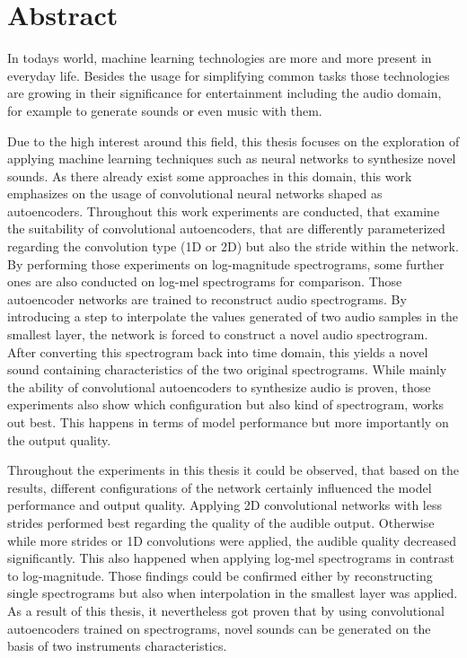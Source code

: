 \chapter{Abstract}

In todays world, machine learning technologies are more and more present in everyday life. Besides the usage for simplifying common tasks those technologies are growing in their significance for entertainment including the audio domain, for example to generate sounds or even music with them. 

Due to the high interest around this field, this thesis focuses on the exploration of applying machine learning techniques such as neural networks to synthesize novel sounds. As there already exist some approaches in this domain, this work emphasizes on the usage of convolutional neural networks shaped as autoencoders. Throughout this work experiments are conducted, that examine the suitability of convolutional autoencoders, that are differently parameterized regarding the convolution type (1D or 2D) but also the stride within the network. By performing those experiments on log-magnitude spectrograms, some further ones are also conducted on log-mel spectrograms for comparison. Those autoencoder networks are trained to reconstruct audio spectrograms. By introducing a step to interpolate the values generated of two audio samples in the smallest layer, the network is forced to construct a novel audio spectrogram. After converting this spectrogram back into time domain, this yields a novel sound containing characteristics of the two original spectrograms. While mainly the ability of convolutional autoencoders to synthesize audio is proven, those experiments also show which configuration but also kind of spectrogram, works out best. This happens in terms of model performance but more importantly on the output quality. 

Throughout the experiments in this thesis it could be observed, that based on the results, different configurations of the network certainly influenced the model performance and output quality. Applying 2D convolutional networks with less strides performed best regarding the quality of the audible output. Otherwise while more strides or 1D convolutions were applied, the audible quality decreased significantly. This also happened when applying log-mel spectrograms in contrast to log-magnitude. Those findings could be confirmed either by reconstructing single spectrograms but also when interpolation in the smallest layer was applied. As a result of this thesis, it nevertheless got proven that by using convolutional autoencoders trained on spectrograms, novel sounds can be generated on the basis of two instruments characteristics.
